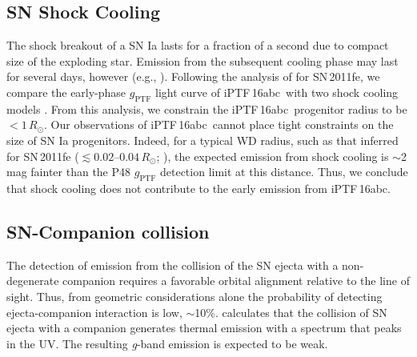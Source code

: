 \documentclass[twocolumn]{aastex61}
\newcommand{\sr}{R_\odot}
\newcommand{\abc}{iPTF\,16abc}
\begin{document}
\subsection{SN Shock Cooling}

The shock breakout of a SN Ia lasts for a fraction of a second due to
compact size of the exploding star. Emission from the subsequent 
cooling phase may last for several days, however (e.g., 
\citealt{2010ApJ...708..598P}). Following the analysis of \citet{2012ApJ...744L..17B} for SN\,2011fe, we
compare the early-phase $g_\mathrm{PTF}$ light curve of \abc\ with
two shock cooling models \citep{2011ApJ...728...63R, 
2010ApJ...708..598P}. From this analysis, we constrain the \abc\ 
progenitor radius to be $<1\,\sr$. Our observations of \abc\ cannot 
place tight constraints on the size of SN Ia progenitors. Indeed, 
for a typical WD radius, such as that inferred for SN\,2011fe 
($\lesssim 0.02$--$0.04\,\sr$; \citealt{2012ApJ...744L..17B, 
2014ApJ...784...85P}), the expected emission from shock cooling is 
$\sim$2 mag fainter than the P48 $g_\mathrm{PTF}$ detection limit at this distance. 
Thus, we conclude that shock cooling does not contribute to the 
early emission from \abc.

\subsection{SN-Companion collision}
\label{sec:companion}

The detection of emission from the collision of the SN ejecta 
with a non-degenerate companion requires a favorable orbital 
alignment relative to the line of sight. Thus, from geometric 
considerations alone the probability of detecting ejecta-companion 
interaction is low, $\sim$10\%. \citet{2010ApJ...708.1025K} 
calculates that the collision of SN ejecta with a companion  
generates thermal emission with a spectrum that peaks in the 
UV. The resulting \textit{g}-band emission is expected to be weak.
\end{document}
